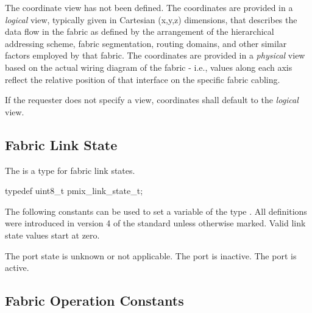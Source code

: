 \begin{constantdesc}
%
The coordinate view has not been defined.
%
The coordinates are provided in a \emph{logical} view, typically given in Cartesian (x,y,z) dimensions, that describes the data flow in the fabric as defined by the arrangement of the hierarchical addressing scheme, fabric segmentation, routing domains, and other similar factors employed by that fabric.
%
The coordinates are provided in a \emph{physical} view based on the actual wiring diagram of the fabric - i.e., values along each axis reflect the relative position of that interface on the specific fabric cabling.
%
\end{constantdesc}

If the requester does not specify a view, coordinates shall default to the \emph{logical} view.

\subsection{Fabric Link State}

The  is a  type for fabric link states.

\cspecificstart
\begin{codepar}
typedef uint8_t pmix_link_state_t;
\end{codepar}
\cspecificend

The following constants can be used to set a variable of the type . All definitions were introduced in version 4 of the standard unless otherwise marked. Valid link state values start at zero.

\begin{constantdesc}
%
The port state is unknown or not applicable.
%
The port is inactive.
%
The port is active.
%
\end{constantdesc}

\subsection{Fabric Operation Constants}

